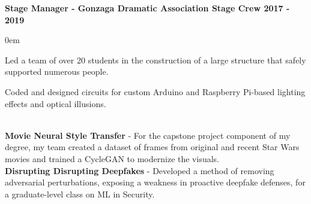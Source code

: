 \documentclass{article}
\begin{document}
\begin{center}
\begin{flushleft}
    \textbf{Stage Manager - Gonzaga Dramatic Association Stage Crew \hfill 2017 - 2019}
    \begin{compactitem}
      \itemsep0em
      \item Led a team of over 20 students in the construction of a large structure that safely supported numerous people.
      \item Coded and designed circuits for custom Arduino and Raspberry Pi-based lighting effects and optical illusions.
    \end{compactitem}

    {\large\textbf{\underline{}}} \\
    \textbf{Movie Neural Style Transfer} - For the capstone project component of my degree, my team created a dataset of frames from original and recent Star Wars movies and trained a CycleGAN to modernize the visuals. \\
    \textbf{Disrupting Disrupting Deepfakes} - Developed a method of removing adversarial perturbations, exposing a weakness in proactive deepfake defenses, for a graduate-level class on ML in Security.


  \end{flushleft}
\end{center}
\end{document}
